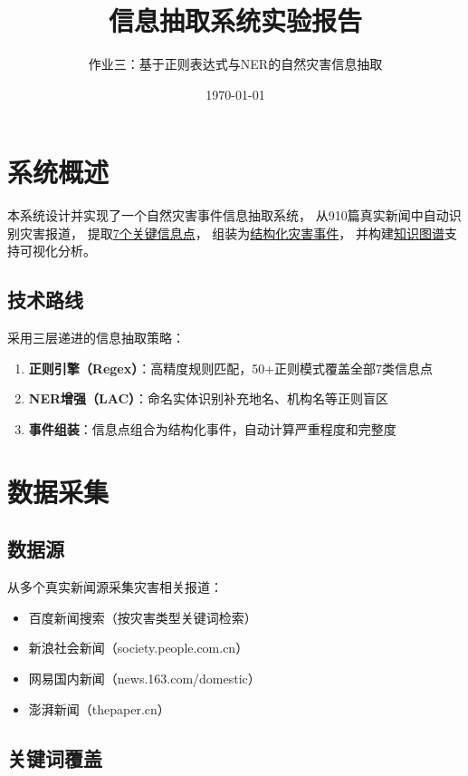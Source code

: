 \documentclass[12pt,a4paper]{ctexart}
\title{信息抽取系统实验报告}
\author{作业三：基于正则表达式与NER的自然灾害信息抽取}
\date{\today}
\begin{document}
\maketitle

\section{系统概述}

本系统设计并实现了一个自然灾害事件信息抽取系统，
从910篇真实新闻中自动识别灾害报道，
提取\underline{7个关键信息点}，
组装为\underline{结构化灾害事件}，
并构建\underline{知识图谱}支持可视化分析。

\subsection{技术路线}

采用三层递进的信息抽取策略：
\begin{enumerate}
    \item \textbf{正则引擎（Regex）}：高精度规则匹配，50+正则模式覆盖全部7类信息点
    \item \textbf{NER增强（LAC）}：命名实体识别补充地名、机构名等正则盲区
    \item \textbf{事件组装}：信息点组合为结构化事件，自动计算严重程度和完整度
\end{enumerate}

\section{数据采集}

\subsection{数据源}

从多个真实新闻源采集灾害相关报道：
\begin{itemize}
    \item 百度新闻搜索（按灾害类型关键词检索）
    \item 新浪社会新闻（society.people.com.cn）
    \item 网易国内新闻（news.163.com/domestic）
    \item 澎湃新闻（thepaper.cn）
\end{itemize}

\subsection{关键词覆盖}
\end{document}
